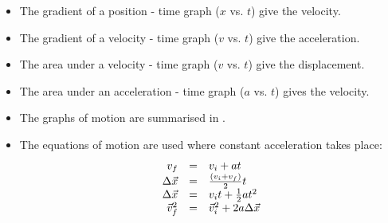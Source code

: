 \begin{itemize}[noitemsep]
    \label{m38796*uid166}\item The gradient of a position - time graph ($x$ vs. $t$) give the velocity.
\label{m38796*uid167}\item The gradient of a velocity - time graph ($v$ vs. $t$) give the acceleration.
\label{m38796*uid168}\item The area under a velocity - time graph ($v$ vs. $t$) give the displacement.
\label{m38796*uid169}\item The area under an acceleration - time graph ($a$ vs. $t$) gives the velocity.
\label{m38796*uid170}\item The graphs of motion are summarised in .
\label{m38796*uid171}\item The equations of motion are used where constant acceleration takes place:
\label{m38796*id81101}\nopagebreak\noindent{}
    \begin{equation*}
    \begin{array}{ccc}\hfill {v}_{f}& =& {v}_{i}+at\hfill \\ \hfill \Delta \vec{x}& =& \frac{\left({v}_{i}+{v}_{f}\right)}{2}t\hfill \\ \hfill \Delta \vec{x}& =& {v}_{i}t+\frac{1}{2}a{t}^{2}\hfill \\ \hfill \vec{v}_{f}^{2}& =& \vec{v}_{i}^{2}+2a\Delta \vec{x}\hfill \end{array}
      \end{equation*}
    \end{itemize}
